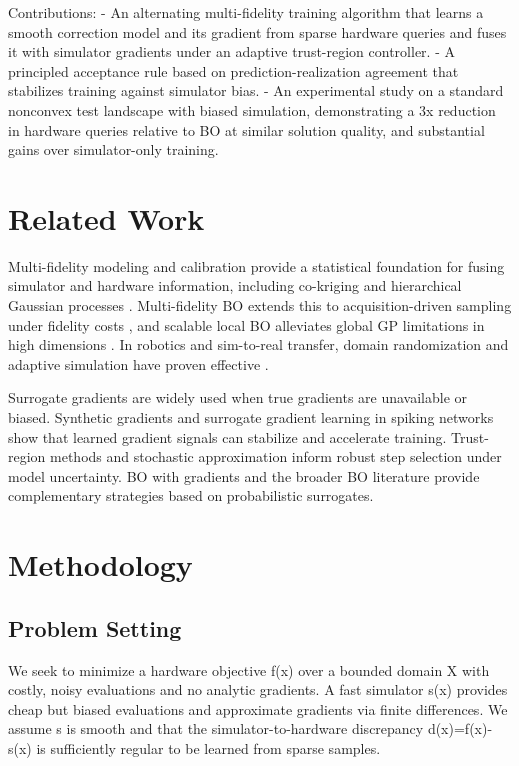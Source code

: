 Contributions:
- An alternating multi-fidelity training algorithm that learns a smooth correction model and its gradient from sparse hardware queries and fuses it with simulator gradients under an adaptive trust-region controller.
- A principled acceptance rule based on prediction-realization agreement that stabilizes training against simulator bias.
- An experimental study on a standard nonconvex test landscape with biased simulation, demonstrating a 3x reduction in hardware queries relative to BO at similar solution quality, and substantial gains over simulator-only training.

\section{Related Work}
Multi-fidelity modeling and calibration provide a statistical foundation for fusing simulator and hardware information, including co-kriging and hierarchical Gaussian processes \citep{Kennedy2000,Kennedy2001,Forrester2007,Perdikaris2017}. Multi-fidelity BO extends this to acquisition-driven sampling under fidelity costs \citep{Swersky2013,Kandasamy2017,Song2019}, and scalable local BO alleviates global GP limitations in high dimensions \citep{Eriksson2019}. In robotics and sim-to-real transfer, domain randomization and adaptive simulation have proven effective \citep{Tobin2017,Chebotar2019}.

Surrogate gradients are widely used when true gradients are unavailable or biased. Synthetic gradients \citep{Jaderberg2017} and surrogate gradient learning in spiking networks \citep{Neftci2019} show that learned gradient signals can stabilize and accelerate training. Trust-region methods \citep{Conn2000} and stochastic approximation \citep{Spall1992} inform robust step selection under model uncertainty. BO with gradients \citep{Wu2017} and the broader BO literature \citep{Shahriari2016,Frazier2018} provide complementary strategies based on probabilistic surrogates.

\section{Methodology}
\subsection{Problem Setting}
We seek to minimize a hardware objective f(x) over a bounded domain X with costly, noisy evaluations and no analytic gradients. A fast simulator s(x) provides cheap but biased evaluations and approximate gradients via finite differences. We assume s is smooth and that the simulator-to-hardware discrepancy d(x)=f(x)-s(x) is sufficiently regular to be learned from sparse samples.

